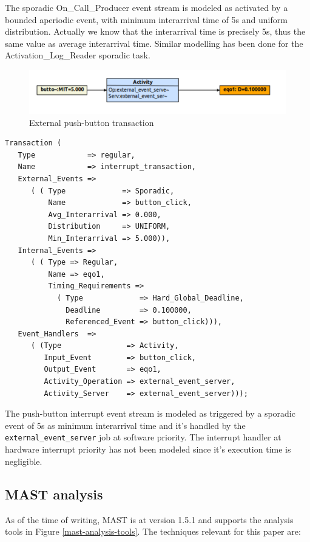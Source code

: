\documentclass{article}
\begin{document}
The sporadic On\_Call\_Producer event stream is modeled as activated by a bounded aperiodic event, with minimum interarrival time of 5s and uniform distribution. Actually we know that the interarrival time is precisely 5s, thus the same value as average interarrival time. Similar modelling has been done for the Activation\_Log\_Reader sporadic task.

\begin{figure}[!htbp]
\centering
\includegraphics[width=6in]{images/transaction-eq}
\caption{External push-button transaction}
\label{transaction-eq}
\end{figure}

\begin{lstlisting}
Transaction (
   Type            => regular,
   Name            => interrupt_transaction,
   External_Events =>
      ( ( Type             => Sporadic,
          Name             => button_click,
          Avg_Interarrival => 0.000,
          Distribution     => UNIFORM,
          Min_Interarrival => 5.000)),
   Internal_Events =>
      ( ( Type => Regular,
          Name => eqo1,
          Timing_Requirements =>
            ( Type             => Hard_Global_Deadline,
              Deadline         => 0.100000,
              Referenced_Event => button_click))),
   Event_Handlers  =>
      ( (Type               => Activity,
         Input_Event        => button_click,
         Output_Event       => eqo1,
         Activity_Operation => external_event_server,
         Activity_Server    => external_event_server)));
\end{lstlisting}

The push-button interrupt event stream is modeled as triggered by a sporadic event of 5s as minimum interarrival time and it's handled by the \texttt{external\_event\_server} job at software priority. The interrupt handler at hardware interrupt priority has not been modeled since it's execution time is negligible.

\subsection{MAST analysis}\label{mast-analysis}

As of the time of writing, MAST is at version 1.5.1 and supports the analysis tools \cite{mast-analysis} in Figure \ref{mast-analysis-tools}. The techniques relevant for this paper are:
\end{document}
